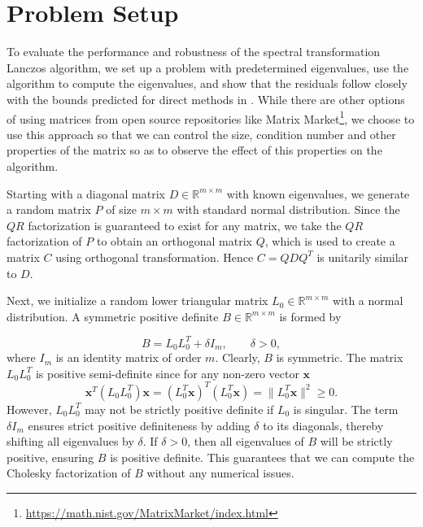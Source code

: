 \section{Problem Setup}\label{sec:ProblemSetup}

To evaluate the performance and robustness of the spectral transformation Lanczos algorithm, we set up a problem with predetermined eigenvalues, use the algorithm to compute the eigenvalues, and show that the residuals follow closely with the bounds predicted for direct methods in \cite{stewart2024spectraltransformationdensesymmetric}. While there are other options of using matrices from open source repositories like Matrix Market\footnote{\href{https://math.nist.gov/MatrixMarket/index.html}{https://math.nist.gov/MatrixMarket/index.html}}, we choose to use this approach so that we can control the size, condition number and other properties of the matrix so as to observe the effect of this properties on the algorithm.

Starting with a diagonal matrix $D \in \mathbb{R}^{m \times m}$ with known eigenvalues, we generate a random matrix $P$ of size $m \times m $ with standard normal distribution. Since the $QR$ factorization is guaranteed to exist for any matrix, we take the $QR$ factorization of $P$ to obtain an orthogonal matrix $Q$, which is used to create a matrix $C$ using orthogonal transformation. Hence $C = QDQ^T$ is unitarily similar to $D$.

Next, we initialize a random lower triangular matrix $L_0 \in \mathbb{R}^{m \times m}$ with a normal distribution. A symmetric positive definite $B \in \mathbb{R}^{m \times m}$ is formed by

\begin{equation}\label{eq:FormingB}
	B = L_0 L_0^T + \delta I_m, \qquad \delta > 0,
\end{equation}
where $I_m$ is an identity matrix of order $m$. Clearly, $B$ is symmetric. The matrix $L_0L_0^T$ is positive semi-definite since for any non-zero vector $\mathbf{x}$
\begin{equation}
	\mathbf{x}^T(L_0L_0^T)\mathbf{x} = (L_0^T\mathbf{x})^T(L_0^T\mathbf{x}) = \| L_0^T\mathbf{x} \|^2 \geq 0.
\end{equation}
However, $L_0L_0^T$ may not be strictly positive definite if $L_0$ is singular. The term $\delta I_m$ ensures strict positive definiteness by adding $\delta$ to its diagonals, thereby shifting all eigenvalues by $\delta$. If $\delta > 0$, then all eigenvalues of $B$ will be strictly positive, ensuring $B$ is positive definite. This guarantees that we can compute the Cholesky factorization of $B$ without any numerical issues.

